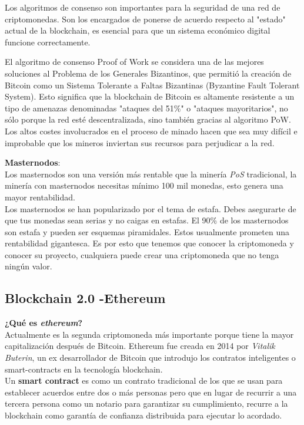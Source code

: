 \documentclass[a4paper,12pt]{/home/armando/Documentos/Cursos/LaTeX/Plantillas/lib/pub}
\begin{document}
Los algoritmos de consenso son importantes para la seguridad de una red de criptomonedas. Son los encargados de ponerse de acuerdo respecto al "estado" actual de la blockchain, es esencial para que un sistema económico digital funcione correctamente. 

El algoritmo de consenso Proof of Work se considera una de las mejores soluciones al Problema de los Generales Bizantinos, que permitió la creación de Bitcoin como un Sistema Tolerante a Faltas Bizantinas (Byzantine Fault Tolerant System). Esto significa que la blockchain de Bitcoin es altamente resistente a un tipo de amenazas denominadas "ataques del 51\%" o "ataques mayoritarios", no sólo porque la red esté descentralizada, sino también gracias al algoritmo PoW. Los altos costes involucrados en el proceso de minado hacen que sea muy difícil e improbable que los mineros inviertan sus recursos para perjudicar a la red.

\textbf{Masternodos}:\\
Los masternodos son una versión más rentable que la minería \textit{PoS} tradicional, la minería con masternodos necesitas mínimo 100 mil monedas, esto genera una mayor rentabilidad.\\
Los masternodos se han popularizado por el tema de estafa. Debes asegurarte de que tus monedas sean serias y no caigas en estafas. El 90\% de los masternodos son estafa y pueden ser esquemas piramidales. Estos usualmente prometen una rentabilidad gigantesca. Es por esto que tenemos que conocer la criptomoneda y conocer su proyecto, cualquiera puede crear una criptomoneda que no tenga ningún valor.
\subsection{Blockchain 2.0 -Ethereum}
\textbf{¿Qué es \textit{ethereum}?}\\

Actualmente es la segunda criptomoneda más importante porque tiene la mayor capitalización después de Bitcoin.
Ethereum fue creada en 2014 por \textit{Vitalik Buterin}, un ex desarrollador de Bitcoin que introdujo los contratos inteligentes o smart-contracts en la tecnología blockchain.\\

Un \textbf{smart contract} es como un contrato tradicional de los que se usan para establecer acuerdos entre dos o más personas pero que en lugar de recurrir a una tercera persona como un notario para garantizar su cumplimiento, recurre a la blockchain como garantía de confianza distribuida para ejecutar lo acordado.
\end{document}
